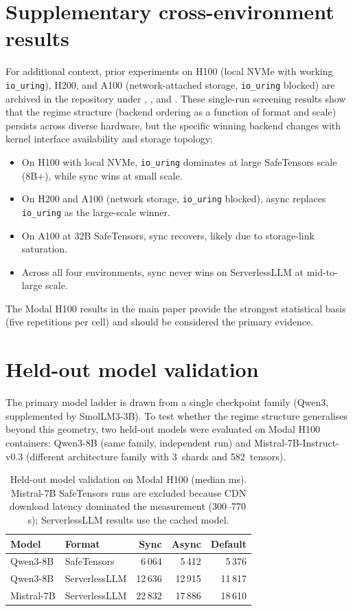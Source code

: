 \section{Supplementary cross-environment results}
\label{app:cross-env}

For additional context, prior experiments on H100 (local NVMe with working \texttt{io\_uring}), H200, and A100 (network-attached storage, \texttt{io\_uring} blocked) are archived in the repository under , , and . These single-run screening results show that the regime structure (backend ordering as a function of format and scale) persists across diverse hardware, but the specific winning backend changes with kernel interface availability and storage topology:

\begin{itemize}
\item On H100 with local NVMe, \texttt{io\_uring} dominates at large SafeTensors scale (8B+), while sync wins at small scale.
\item On H200 and A100 (network storage, \texttt{io\_uring} blocked), async replaces \texttt{io\_uring} as the large-scale winner.
\item On A100 at 32B SafeTensors, sync recovers, likely due to storage-link saturation.
\item Across all four environments, sync never wins on ServerlessLLM at mid-to-large scale.
\end{itemize}

The Modal H100 results in the main paper provide the strongest statistical basis (five repetitions per cell) and should be considered the primary evidence.

\section{Held-out model validation}
\label{app:held-out}

The primary model ladder is drawn from a single checkpoint family (Qwen3, supplemented by SmolLM3-3B). To test whether the regime structure generalises beyond this geometry, two held-out models were evaluated on Modal H100 containers: Qwen3-8B (same family, independent run) and Mistral-7B-Instruct-v0.3 (different architecture family with 3~shards and 582~tensors).

\begin{table}[htbp]
\caption{Held-out model validation on Modal H100 (median ms). Mistral-7B SafeTensors runs are excluded because CDN download latency dominated the measurement (300--770\,s); ServerlessLLM results use the cached model.}
\label{tab:held-out}
\centering
\begin{tabular}{llrrr}
\toprule
Model & Format & Sync & Async & Default \\
\midrule
Qwen3-8B & SafeTensors & 6\,064 & 5\,412 & 5\,376 \\
Qwen3-8B & ServerlessLLM & 12\,636 & 12\,915 & 11\,817 \\
Mistral-7B & ServerlessLLM & 22\,832 & 17\,886 & 18\,610 \\
\bottomrule
\end{tabular}
\end{table}

